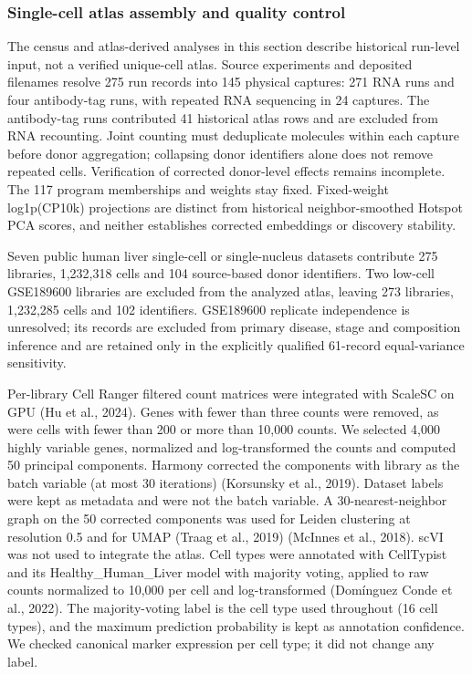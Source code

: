 \subsubsection{Single-cell atlas assembly and quality control}\label{single-cell-atlas-assembly-and-quality-control}

The census and atlas-derived analyses in this section describe historical
run-level input, not a verified unique-cell atlas. Source experiments and
deposited filenames resolve 275 run records into 145 physical captures:
271 RNA runs and four antibody-tag runs, with repeated RNA sequencing in
24 captures. The antibody-tag runs contributed 41 historical atlas rows and
are excluded from RNA recounting. Joint counting must deduplicate molecules
within each capture before donor aggregation; collapsing donor identifiers
alone does not remove repeated cells. Verification of corrected donor-level
effects remains incomplete. The 117 program memberships and weights stay
fixed. Fixed-weight log1p(CP10k) projections are distinct from historical
neighbor-smoothed Hotspot PCA scores, and neither establishes corrected
embeddings or discovery stability.

Seven public human liver single-cell or single-nucleus datasets contribute 275 libraries, 1,232,318 cells and 104 source-based donor identifiers. Two low-cell GSE189600 libraries are excluded from the analyzed atlas, leaving 273 libraries, 1,232,285 cells and 102 identifiers. GSE189600 replicate independence is unresolved; its records are excluded from primary disease, stage and composition inference and are retained only in the explicitly qualified 61-record equal-variance sensitivity.

Per-library Cell Ranger filtered count matrices were integrated with ScaleSC on GPU (Hu et al., 2024). Genes with fewer than three counts were removed, as were cells with fewer than 200 or more than 10,000 counts. We selected 4,000 highly variable genes, normalized and log-transformed the counts and computed 50 principal components. Harmony corrected the components with library as the batch variable (at most 30 iterations) (Korsunsky et al., 2019). Dataset labels were kept as metadata and were not the batch variable. A 30-nearest-neighbor graph on the 50 corrected components was used for Leiden clustering at resolution 0.5 and for UMAP (Traag et al., 2019) (McInnes et al., 2018). scVI was not used to integrate the atlas. Cell types were annotated with CellTypist and its Healthy\_\allowbreak{}Human\_\allowbreak{}Liver model with majority voting, applied to raw counts normalized to 10,000 per cell and log-transformed (Domínguez Conde et al., 2022). The majority-voting label is the cell type used throughout (16 cell types), and the maximum prediction probability is kept as annotation confidence. We checked canonical marker expression per cell type; it did not change any label.


